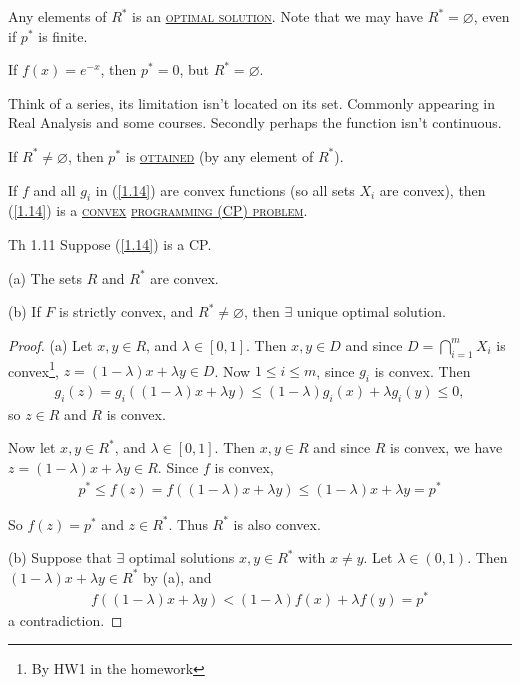 Any elements of $R^*$ is an \underline{\textcolor{MarkerColour}{\textsc{optimal solution}}}. Note that we may have $R^* = \varnothing$, even if $p^*$ is finite.
\begin{example}
    If $f(x) = e^{-x}$, then $p^* = 0$, but $R^* = \varnothing$. 

    Think of a series, its limitation isn't located on its set. Commonly appearing in Real Analysis and some courses. Secondly perhaps the function isn't continuous.
\end{example}

If $R^*\neq\varnothing$, then $p^*$ is \underline{\textcolor{MarkerColour}{\textsc{ottained}}} (by any element of $R^*$).

If $f$ and all $g_i$ in (\ref{1.14}) are convex functions (so all sets $X_i$ are convex), then (\ref{1.14}) is a \underline{\textcolor{MarkerColour}{\textsc{convex}}} \underline{\textcolor{MarkerColour}{\textsc{programming (CP) problem}}}.

\begin{theorem}
    Th 1.11 Suppose (\ref{1.14}) is a CP.

    (a) The sets $R$ and $R^*$ are convex.

    (b) If $F$ is strictly convex, and $R^*\neq \varnothing$, then $\exists$ unique optimal solution.
\end{theorem}
\begin{proof}
    (a) Let $x, y\in R$, and $\lambda\in[0, 1]$. Then $x, y\in D$ and since $D = \bigcap\limits_{i=1}^m X_i$ is convex\footnote{By HW1 in the homework}, $z=(1-\lambda)x+\lambda y\in D$. Now $1\le i\le m$, since $g_i$ is convex. Then
    \begin{align*}
        g_i(z) = g_i\left( (1-\lambda)x+\lambda y\right) \le (1-\lambda) g_i(x) + \lambda g_i(y) \le 0,
    \end{align*}
    so $z\in R$ and $R$ is convex.

    Now let $x, y\in R^*$, and $\lambda\in [0, 1]$. Then $x, y\in R$ and since $R$ is convex, we have $z = (1-\lambda)x+\lambda y\in R$. Since $f$ is convex, 
    \begin{align*}
        p^*\le f(z)= f\left( (1-\lambda)x+\lambda y\right)\le (1-\lambda)x+\lambda y = p^*
    \end{align*}

    So $f(z) = p^*$ and $z\in R^*$. Thus $R^*$ is also convex.

    (b) Suppose that $\exists$ optimal solutions $x, y\in R^*$ with $x\neq y$. Let $\lambda \in(0, 1)$. Then $(1-\lambda)x+\lambda y\in R^*$ by (a), and 
    \begin{align*}
        f\left((1-\lambda)x+\lambda y\right) < (1-\lambda)f(x)+\lambda f(y) = p^*
    \end{align*}
    a contradiction.
\end{proof}


